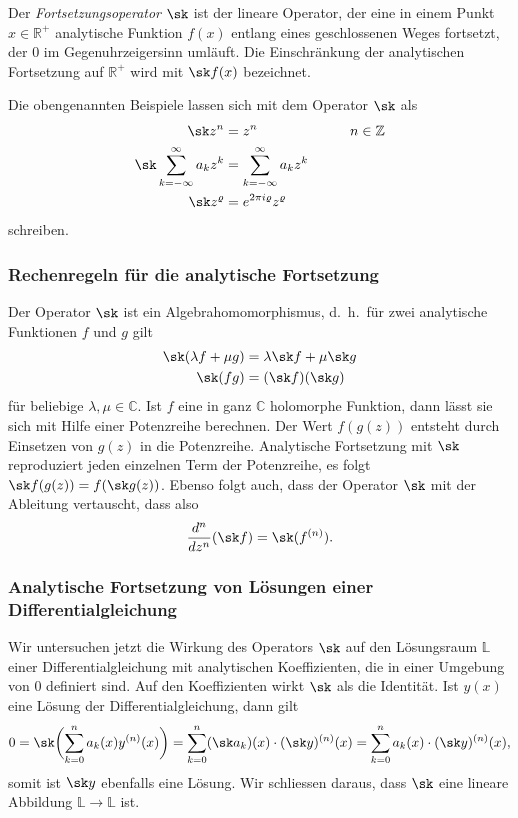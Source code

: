 \begin{definition}
\label{buch:funktionentheorie:def:fortsetzungsoperator}
%
Der {\em Fortsetzungsoperator} $\sk$ ist der lineare Operator, der eine
in einem Punkt $x\in\mathbb{R}^+$ analytische Funktion $f(x)$ entlang eines
geschlossenen Weges fortsetzt, der $0$ im Gegenuhrzeigersinn umläuft.
Die Einschränkung der analytischen Fortsetzung auf $\mathbb{R}^+$ wird
mit $\sk f(x)$ bezeichnet.
%
%
\end{definition}

Die obengenannten Beispiele lassen sich mit dem Operator $\sk$ als
\[
\begin{aligned}
\sk z^n
&=
z^n
&\qquad& n \in \mathbb{Z}
\\
\sk
\sum_{k=-\infty}^\infty a_kz^k
&=
\sum_{k=-\infty}^\infty a_kz^k
\\
\sk z^\varrho
&=
e^{2\pi i\varrho} z^\varrho
\end{aligned}
\]
schreiben.

%
%
\subsubsection{Rechenregeln für die analytische Fortsetzung}
Der Operator $\sk$ ist ein Algebrahomomorphismus, d.~h.~für zwei analytische
Funktionen $f$ und $g$ gilt
\[
\begin{aligned}
\sk(\lambda f + \mu g)
&=
\lambda \sk f  + \mu \sk g
\\
\sk(fg)
&=
(\sk f)(\sk g)
\end{aligned}
\]
für beliebige $\lambda,\mu\in\mathbb{C}$.
Ist $f$ eine in ganz $\mathbb{C}$ holomorphe Funktion, dann lässt sie
sich mit Hilfe einer Potenzreihe berechnen.
Der Wert $f(g(z))$ entsteht durch Einsetzen von $g(z)$ in die Potenzreihe.
Analytische Fortsetzung mit $\sk$ reproduziert jeden einzelnen Term
der Potenzreihe, es folgt
$\sk f(g(z)) = f(\sk g(z))$.
Ebenso folgt auch, dass der Operator $\sk$ mit der Ableitung
vertauscht, dass also
\[
\frac{d^n}{dz^n}(\sk f)
=
\sk(f^{(n)}).
\]

%
%
\subsubsection{Analytische Fortsetzung von Lösungen einer Differentialgleichung}
Wir untersuchen jetzt die Wirkung des Operators $\sk$ auf
den Lösungsraum $\mathbb{L}$ einer Differentialgleichung mit
analytischen Koeffizienten, die in einer Umgebung von $0$
definiert sind.
Auf den Koeffizienten wirkt $\sk$ als die Identität. 
Ist $y(x)$ eine Lösung der Differentialgleichung, dann gilt
\[
0
=
\sk\biggl(
\sum_{k=0}^n a_k(x) y^{(n)}(x)
\biggr)
=
\sum_{k=0}^n (\sk a_k)(x) \cdot (\sk y)^{(n)}(x)
=
\sum_{k=0}^n a_k(x) \cdot (\sk y)^{(n)}(x),
\]
somit ist $\sk y$ ebenfalls eine Lösung.
Wir schliessen daraus, dass $\sk$ eine lineare Abbildung 
$\mathbb{L}\to\mathbb{L}$ ist.

